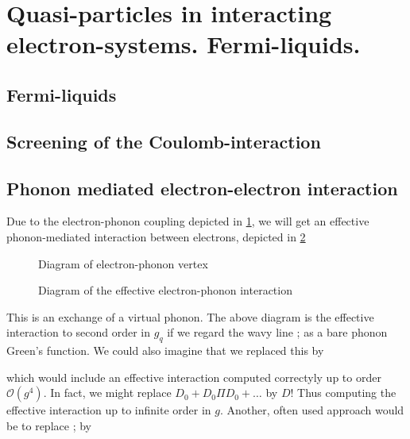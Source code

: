 \section{Quasi-particles in interacting electron-systems. Fermi-liquids.}

\subsection{Fermi-liquids}

\subsection{Screening of the Coulomb-interaction}

\subsection{Phonon mediated electron-electron interaction}

Due to the electron-phonon coupling depicted in \cref{fig:el-ph-vertex}, we will get an effective phonon-mediated interaction between electrons, depicted in \cref{fig:el-ph-interaction}

\begin{figure}
	\centering
	
	\caption{Diagram of electron-phonon vertex}
	\label{fig:el-ph-vertex}
\end{figure}


\begin{figure}
	\centering
	
	\caption{Diagram of the effective electron-phonon interaction}
	\label{fig:el-ph-interaction}
\end{figure}


This is an exchange of a virtual phonon. The above diagram is the effective interaction to second order in $g_q$ if we regard the wavy line ; as a bare phonon Green's function. We could also imagine that we replaced this by

which would include an effective interaction computed correctyly up to order $\mathcal{O}(g^4)$. In fact, we might replace $D_0 + D_0\Pi D_0 +\dots$ by $D!$ Thus computing the effective interaction up to infinite order in $g$. Another, often used approach would be to replace ; by  


